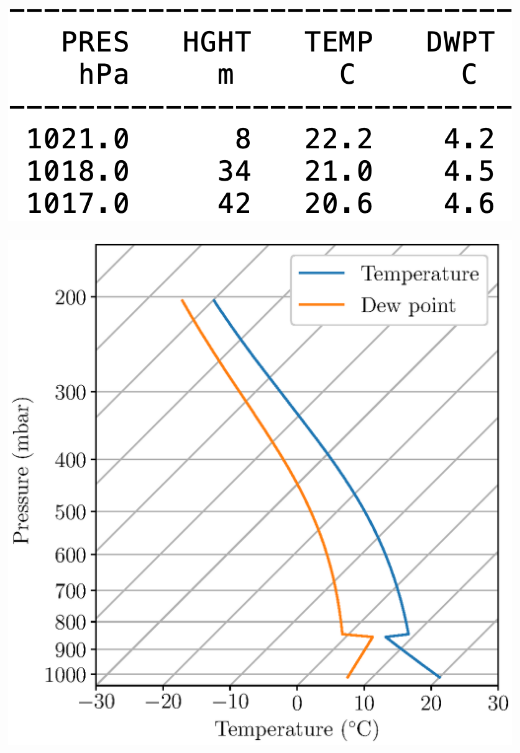 \documentclass{beamer}
\begin{document}
\begin{frame}[fragile]
\begin{columns}
\begin{column}{0.3\textwidth}
\begin{overlayarea}{\textwidth}{7cm}
{        \vspace{5mm}
        \includegraphics[width=\linewidth]{sounding.png}

        \vspace{1cm}
        \includegraphics[width=\linewidth]{skewt.eps}
        }
        \end{overlayarea}
    \end{column}
    \end{columns}
\end{frame}
\end{document}
